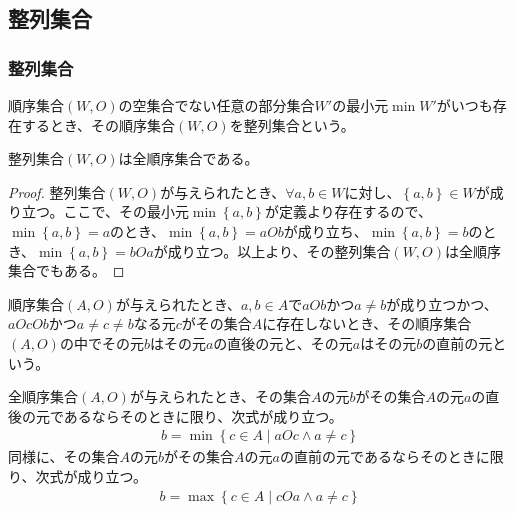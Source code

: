 \documentclass[dvipdfmx]{jsarticle}
\begin{document}
\subsection{整列集合}%
\subsubsection{整列集合}%
\begin{dfn}
順序集合$(W,O)$の空集合でない任意の部分集合$W'$の最小元$\min W'$がいつも存在するとき、その順序集合$(W,O)$を整列集合という。
\end{dfn}
\begin{thm}\label{1.3.2.1}
整列集合$(W,O)$は全順序集合である。
\end{thm}
\begin{proof}
整列集合$(W,O)$が与えられたとき、$\forall a,b \in W$に対し、$\left\{ a,b \right\} \in W$が成り立つ。ここで、その最小元$\min\left\{ a,b \right\}$が定義より存在するので、$\min\left\{ a,b \right\} = a$のとき、$\min\left\{ a,b \right\} = aOb$が成り立ち、$\min\left\{ a,b \right\} = b$のとき、$\min\left\{ a,b \right\} = bOa$が成り立つ。以上より、その整列集合$(W,O)$は全順序集合でもある。
\end{proof}
\begin{dfn}
順序集合$(A,O)$が与えられたとき、$a,b \in A$で$aOb$かつ$a \neq b$が成り立つかつ、$aOcOb$かつ$a \neq c \neq b$なる元$c$がその集合$A$に存在しないとき、その順序集合$(A,O)$の中でその元$b$はその元$a$の直後の元と、その元$a$はその元$b$の直前の元という。
\end{dfn}
\begin{thm}\label{1.3.2.2}
全順序集合$(A,O)$が与えられたとき、その集合$A$の元$b$がその集合$A$の元$a$の直後の元であるならそのときに限り、次式が成り立つ。
\begin{align*}
b = \min\left\{ c \in A \middle| aOc \land a \neq c \right\}
\end{align*}
同様に、その集合$A$の元$b$がその集合$A$の元$a$の直前の元であるならそのときに限り、次式が成り立つ。
\begin{align*}
b = \max\left\{ c \in A \middle| cOa \land a \neq c \right\}
\end{align*}
\end{thm}
\end{document}
